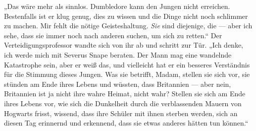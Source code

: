 „Das wäre mehr als sinnlos. Dumbledore kann den Jungen nicht erreichen. Bestenfalls ist er klug genug, dies zu wissen und die Dinge nicht noch schlimmer zu machen. Mir fehlt die nötige Geisteshaltung. \emph{Sie} sind diejenige, die — aber ich sehe, dass sie immer noch nach anderen suchen, um sich zu retten.“ Der Verteidigungsprofessor wandte sich von ihr ab und schritt zur Tür.
„Ich denke, ich werde mich mit Severus Snape beraten. Der Mann mag eine wandelnde Katastrophe sein, aber er weiß das, und vielleicht hat er ein besseres Verständnis für die Stimmung dieses Jungen. Was sie betrifft, Madam, stellen sie sich vor, sie stünden am Ende ihres Lebens und wüssten, dass Britannien — aber nein, Britannien ist ja nicht ihre wahre Heimat, nicht wahr? Stellen sie sich am Ende ihres Lebens vor, wie sich die Dunkelheit durch die verblassenden Mauern von Hogwarts frisst, wissend, dass ihre Schüler mit ihnen sterben werden, sich an diesen Tag erinnernd und erkennend, dass sie etwas anderes hätten tun können.“

